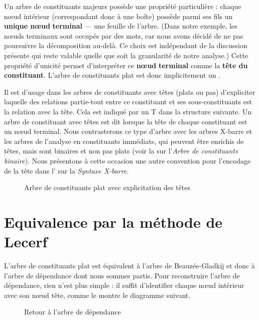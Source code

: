 Un arbre de constituants majeurs possède une propriété particulière : chaque nœud intérieur (correspondant donc à une boîte) possède parmi ses fils un \textbf{unique nœud} \textbf{terminal} — une feuille de l’arbre. (Dans notre exemple, les nœuds terminaux sont occupés par des mots, car nous avons décidé de ne pas poursuivre la décomposition au-delà. Ce choix est indépendant de la discussion présente qui reste valable quelle que soit la granularité de notre analyse.) Cette propriété d’unicité permet d’interpréter ce \textbf{nœud} \textbf{terminal} comme la \textbf{tête du constituant}. L’arbre de constituants plat est donc implicitement un .

Il est d’usage dans les arbres de constituants avec têtes (plats ou pas) d’expliciter laquelle des relations partie-tout entre ce constituant et ses sous-constituants est la relation avec la tête. Cela est indiqué par un T dans la structure suivante. Un arbre de constituant avec têtes est dit  lorsque la tête de chaque constituant est un nœud terminal. Nous contrasterons ce type d’arbre avec les arbres X-barre et les arbres de l’analyse en constituants immédiats, qui peuvent être enrichis de têtes, mais sont binaires et non pas plats (voir la  sur l’\textit{Arbre de constituants binaire}). Nous présentons à cette occasion une autre convention pour l’encodage de la tête dans l’ sur la \textit{Syntaxe X-barre}.

\begin{figure}

\caption{\label{fig:}Arbre de constituants plat avec explicitation des têtes}

\end{figure}

\section{Equivalence par la méthode de Lecerf}\label{sec:3.4.5}

L’arbre de constituants plat est équivalent à l’arbre de Beauzée-Gladkij et donc à l’arbre de dépendance dont nous sommes partis. Pour reconstruire l’arbre de dépendance, rien n’est plus simple : il suffit d’identifier chaque nœud intérieur avec son nœud tête, comme le montre le diagramme suivant.

\begin{figure}

\caption{\label{fig:}Retour à l’arbre de dépendance}

\end{figure}

